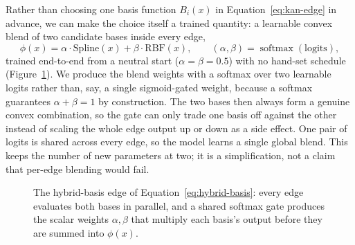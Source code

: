 Rather than choosing one basis function $B_i(x)$ in
Equation~\ref{eq:kan-edge} in advance, we can make the choice itself a
trained quantity: a learnable convex blend of two candidate bases inside
every edge,
\begin{equation}
\phi(x) = \alpha\cdot\mathrm{Spline}(x) + \beta\cdot\mathrm{RBF}(x),
\qquad (\alpha,\beta) = \operatorname{softmax}(\text{logits}),
\label{eq:hybrid-basis}
\end{equation}
trained end-to-end from a neutral start ($\alpha=\beta=0.5$) with no
hand-set schedule (Figure~\ref{fig:hybrid-schematic}). We produce the blend
weights with a softmax over two learnable logits rather than, say, a single
sigmoid-gated weight, because a softmax guarantees $\alpha+\beta=1$ by
construction. The two bases then always form a genuine convex combination,
so the gate can only trade one basis off against the other instead of
scaling the whole edge output up or down as a side effect. One pair of
logits is shared across every edge, so the model learns a single global
blend. This keeps the number of new parameters at two; it is a
simplification, not a claim that per-edge blending would fail.

\begin{figure}[t]
\centering
{}
\caption{The hybrid-basis edge of Equation~\ref{eq:hybrid-basis}: every edge
evaluates both bases in parallel, and a shared softmax gate produces the
scalar weights $\alpha,\beta$ that multiply each basis's output before they
are summed into $\phi(x)$.}
\label{fig:hybrid-schematic}
\end{figure}

